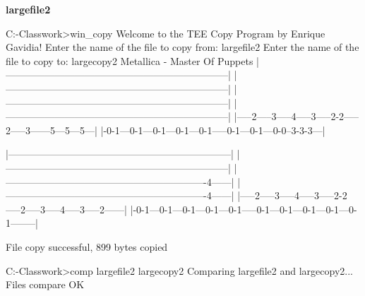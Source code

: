 \documentclass[12pt]{article}
\newcommand {\filename}[1] {\flushleft \textbf{#1}}
\begin{document}
\filename{largefile2}
\begin{shelloutput}
C:\Users\Enrique\School\OS-Classwork>win_copy
Welcome to the TEE Copy Program by Enrique Gavidia!
Enter the name of the file to copy from:
largefile2
Enter the name of the file to copy to:
largecopy2
Metallica - Master Of Puppets
|--------------------------------------------------------------------|
|--------------------------------------------------------------------|
|--------------------------------------------------------------------|
|--------------------------------------------------------------------|
|-----2-----3-----4-----3-----2-2-----2-----3------5\4---5\4---5\4---|
|-0-1---0-1---0-1---0-1---0-1-----0-1---0-1---0-0--3-3-3\2---|

|--------------------------------------------------------------------|
|--------------------------------------------------------------------|
|-------------------------------------------------------------4------|
|-------------------------------------------------------------4------|
|-----2-----3-----4-----3-----2-2-----2-----3-----4-----3-----2------|
|-0-1---0-1---0-1---0-1---0-1-----0-1---0-1---0-1---0-1---0-1--------|


File copy successful, 899 bytes copied

C:\Users\Enrique\School\OS-Classwork>comp largefile2 largecopy2
Comparing largefile2 and largecopy2...
Files compare OK

\end{shelloutput}
\end{document}
